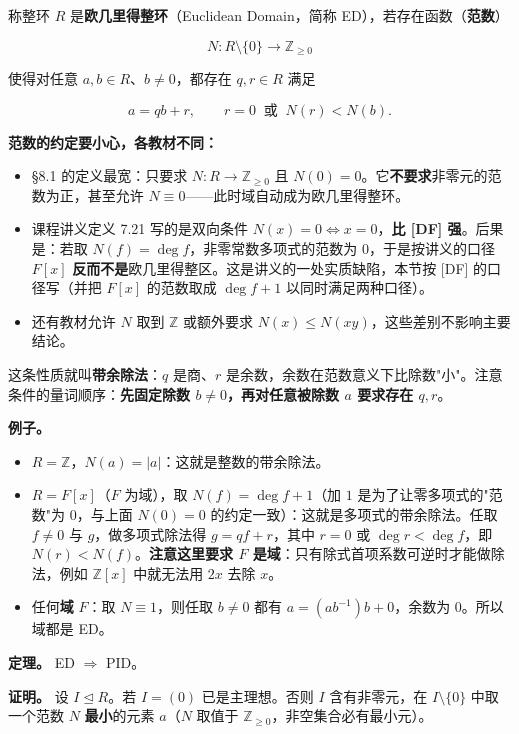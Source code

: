 称整环 $R$ 是\textbf{欧几里得整环}（Euclidean Domain，简称 ED），若存在函数（\textbf{范数}）

\[
N:R\setminus\{0\}\longrightarrow\mathbb Z_{\ge0}
\]

使得对任意 $a,b\in R$、$b\ne0$，都存在 $q,r\in R$ 满足

\[
a=qb+r,\qquad r=0\ \text{ 或 }\ N(r)<N(b).
\]

\textbf{范数的约定要小心，各教材不同：}

\begin{itemize}
\item [DF] §8.1 的定义最宽：只要求 $N:R\to\mathbb Z_{\ge0}$ 且 $N(0)=0$。它\textbf{不要求}非零元的范数为正，甚至允许 $N\equiv0$——此时域自动成为欧几里得整环。
\item 课程讲义定义 7.21 写的是双向条件 $N(x)=0\iff x=0$，\textbf{比 [DF] 强}。后果是：若取 $N(f)=\deg f$，非零常数多项式的范数为 $0$，于是按讲义的口径 $F[x]$ \textbf{反而不是}欧几里得整区。这是讲义的一处实质缺陷，本节按 [DF] 的口径写（并把 $F[x]$ 的范数取成 $\deg f+1$ 以同时满足两种口径）。
\item 还有教材允许 $N$ 取到 $\mathbb Z$ 或额外要求 $N(x)\le N(xy)$，这些差别不影响主要结论。
\end{itemize}


这条性质就叫\textbf{带余除法}：$q$ 是商、$r$ 是余数，余数在范数意义下比除数"小"。注意条件的量词顺序：\textbf{先固定除数 $b\ne0$，再对任意被除数 $a$ 要求存在 $q,r$}。

\textbf{例子。}

\begin{itemize}
\item $R=\mathbb Z$，$N(a)=|a|$：这就是整数的带余除法。
\item $R=F[x]$（$F$ 为域），取 $N(f)=\deg f+1$（加 $1$ 是为了让零多项式的"范数"为 $0$，与上面 $N(0)=0$ 的约定一致）：这就是多项式的带余除法。任取 $f\ne0$ 与 $g$，做多项式除法得 $g=qf+r$，其中 $r=0$ 或 $\deg r<\deg f$，即 $N(r)<N(f)$。\textbf{注意这里要求 $F$ 是域}：只有除式首项系数可逆时才能做除法，例如 $\mathbb Z[x]$ 中就无法用 $2x$ 去除 $x$。
\item 任何\textbf{域} $F$：取 $N\equiv1$，则任取 $b\ne0$ 都有 $a=(ab^{-1})b+0$，余数为 $0$。所以域都是 ED。
\end{itemize}


\textbf{定理。} ED $\Longrightarrow$ PID。

\textbf{证明。} 设 $I\trianglelefteq R$。若 $I=(0)$ 已是主理想。否则 $I$ 含有非零元，在 $I\setminus\{0\}$ 中取一个范数 $N$ \textbf{最小}的元素 $a$（$N$ 取值于 $\mathbb Z_{\ge0}$，非空集合必有最小元）。

